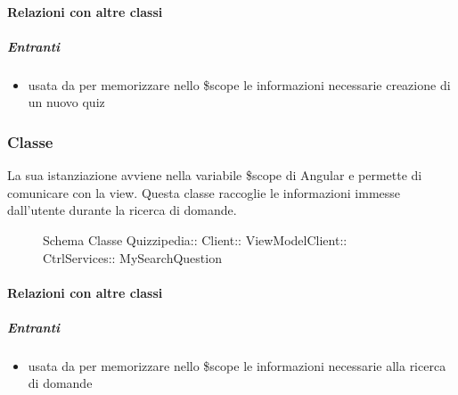 \paragraph{Relazioni con altre classi}
\subparagraph{Entranti}
\begin{itemize}
\item usata da  per memorizzare nello \$scope le informazioni necessarie creazione di un nuovo quiz
\end{itemize}
\subsubsection{Classe }
La sua istanziazione avviene nella variabile \$scope di Angular e permette di comunicare con la view. Questa classe raccoglie le informazioni immesse dall'utente durante la ricerca di domande.
\begin{figure}[H]
\centering
\noindent{}
\caption[Schema Classe MySearchQuestion]{Schema Classe Quizzipedia:: Client:: ViewModelClient:: CtrlServices:: MySearchQuestion}
\end{figure}
\paragraph{Relazioni con altre classi}
\subparagraph{Entranti}
\begin{itemize}
\item usata da  per memorizzare nello \$scope le informazioni necessarie alla ricerca di domande
\end{itemize}
